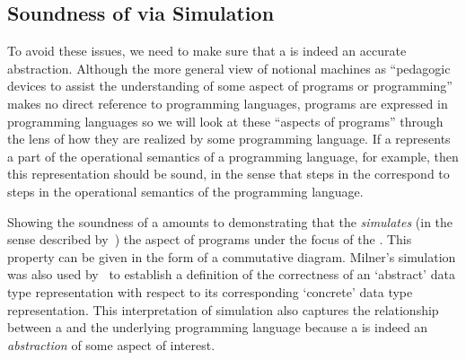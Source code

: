 \subsection{Soundness of \NMs{} via Simulation}
To avoid
these issues,
we need to make sure that a \nm{} 
is indeed an accurate abstraction.
%
Although
the more general view of
notional machines
as ``pedagogic devices to assist the understanding of some aspect of programs or programming''~\citep{fincherNotionalMachinesComputing2020}
makes no direct reference to programming languages,
programs are expressed in programming languages
so we will look at these ``aspects of programs''
through the lens of how they are realized by some programming language.
%
If a \nm{}
represents
a part of the operational semantics of a programming language,
for example,
then
this
representation
should be sound, in the sense that
steps in the \nm{}
correspond to steps in the operational semantics of the programming language.


Showing the soundness of a \nm{}
amounts to demonstrating that
the \nm{} \emph{simulates}
(in the sense described by~\citet{milnerAlgebraicDefinitionSimulation1971})
the aspect of programs under the focus of the \nm{}.
%
This property can be given in the form of a commutative diagram.
%
Milner's simulation was also used
by~\citet{hoareProofCorrectnessData1972}
to establish a definition of
the correctness of
an `abstract' data type representation
with respect to
its corresponding `concrete' data type representation.
%
This interpretation of simulation
also captures the relationship between a \nm{} and the underlying programming language
because
a \nm{} is indeed an \emph{abstraction} of some aspect of interest.


